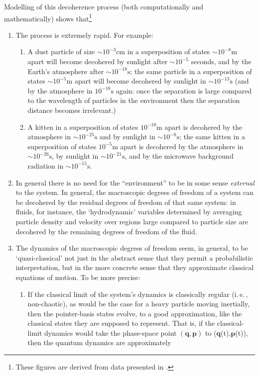 \documentclass[12pt]{article}
\newcommand{\iec}{\mbox{i.\,e.\,}}
\newcommand{\vctr}[1]{\ensuremath{\mathbf{ #1 }}}
\begin{document}
Modelling of this decoherence process (both computationally and mathematically) shows that\footnote{These figures are derived from data presented in .} 
\begin{enumerate}
\item The process is extremely rapid. For example:
\begin{enumerate}
\item A dust particle of size $\sim 10^{-3} \mathrm{cm}$ in a superposition of states $\sim 10^{-8} \mathrm{m}$ apart will become decohered by sunlight after $\sim 10^{-5}$ seconds, and by the Earth's atmosphere after $\sim 10^{-18} \mathrm{s}$; the same particle in a superposition of states $\sim 10^{-5} \mathrm{m}$ apart will become decohered by sunlight in $\sim 10^{-13} \mathrm{s}$ (and by the atmosphere in $10^{-18}\mathrm{s}$ again: once the separation is large compared to the wavelength of particles in the environment then the separation distance becomes irrelevant.)  
\item A kitten in a superposition of states $10^{-10}\mathrm{m}$ apart is decohered by the atmosphere in $\sim 10^{-25}\mathrm{s}$ and by sunlight in $\sim 10^{-8}\mathrm{s}$; the same kitten in a superposition of states $10^{-5} \mathrm{m}$ apart is decohered by the atmosphere in $\sim 10^{-26}\mathrm{s}$, by sunlight in $\sim 10^{-21}\mathrm{s}$, and by the microwave background radiation in $\sim 10^{-15}\mathrm{s}$.
\end{enumerate}
\item In general there is no need for the ``environment'' to be in some sense \emph{external} to the system. In general, the macroscopic degrees of freedom of a system can be decohered by the residual degrees of freedom of that same system: in fluids, for instance, the `hydrodynamic' variables determined by averaging particle density and velocity over regions large compared to particle size are decohered by the remaining degrees of freedom of the fluid. 
\item The dynamics of the macroscopic degrees of freedom seem, in general, to be `quasi-classical' not just in the abstract sense that they permit a probabilistic interpretation, but in the more concrete sense that they approximate classical equations of motion. To be more precise: 
\begin{enumerate}
\item If the classical limit of the system's dynamics  is classically regular (\iec, non-chaotic), as would be the case for a heavy particle moving inertially, then the pointer-basis states evolve, to a good approximation, like the classical states they are supposed to represent. That is, if the classical-limit dynamics would take the phase-space point $(\vctr{q},\vctr{p})$ to (\vctr{q}(t),\vctr{p}(t)), then the quantum dynamics are approximately

\end{enumerate}
\end{enumerate}
\end{document}
